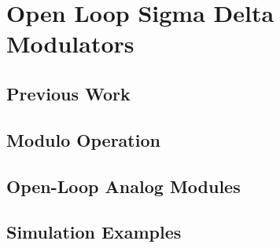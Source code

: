 \chapter{Open Loop Sigma Delta Modulators}
\section{Previous Work}

\section{Modulo Operation}

\section{Open-Loop Analog Modules}

\section{Simulation Examples}
